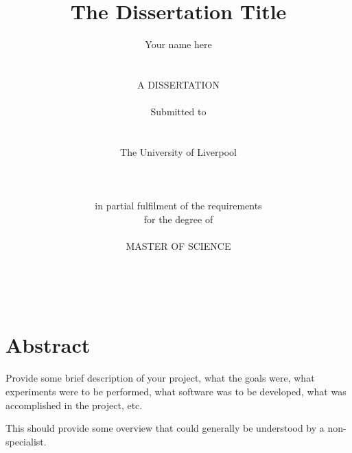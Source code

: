 \documentclass[a4paper,11pt]{report}
\begin{document}



\thispagestyle{empty}  %

\title{\LARGE
The Dissertation Title}

\author{Your name here
\\    \\    \\
A DISSERTATION
\\    \\
Submitted to 
\\    \\    \\ 
The University of Liverpool
\\    \\
\\    \\
in partial fulfilment of the requirements
\\
for the degree of 
\\     \\
MASTER OF SCIENCE
\\     \\    \\    \\
}


\date{}


\maketitle


\chapter*{\center Abstract}

Provide some brief description of your project, what the goals were,
what experiments were to be performed, what software was
to be developed, what was accomplished in the project, etc.  

This should provide some overview that could generally 
be understood by a 
non-specialist.  

\newpage
\end{document}
